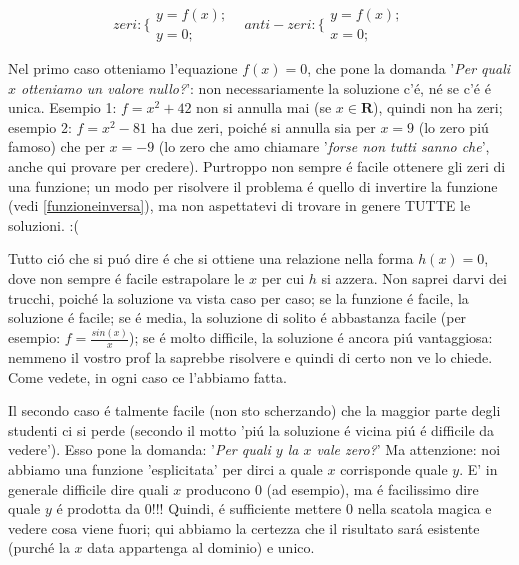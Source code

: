 \begin{equation}
zeri: \bigg\{
	\begin{array}{l}
	  y=f(x); \\
 	  y=0; 
	\end{array}
\hspace{10pt} anti-zeri: \bigg\{
	\begin{array}{l}
	  y=f(x); \\
 	  x=0; 
	\end{array}
\end{equation}

Nel primo caso otteniamo l'equazione $f(x)=0$, che pone la domanda '{\em Per quali $x$ otteniamo un valore nullo?}':
non necessariamente la soluzione c'\'e, n\'e se c'\'e \'e unica. Esempio 1: $f=x^2+42$ non si annulla mai
(se $x \in \mathbf{R}$), quindi non ha zeri; esempio 2: $f=x^2-81$ ha due zeri, poich\'e si annulla sia per $x=9$
(lo zero pi\'u famoso) che per $x=-9$ (lo zero che amo chiamare '{\em forse non tutti sanno che}', anche qui provare
per credere). Purtroppo non sempre \'e facile ottenere gli zeri di una funzione; un modo per risolvere il problema
\'e quello di invertire la funzione (vedi \ref{funzioneinversa}), ma non aspettatevi di trovare in genere TUTTE le soluzioni. :(

Tutto ci\'o che si pu\'o dire \'e che si ottiene una relazione nella forma $h(x)=0$, dove non sempre \'e facile
estrapolare le $x$ per cui $h$ si azzera. Non saprei darvi dei trucchi, poich\'e la soluzione va vista caso per caso;
se la funzione \'e facile, la soluzione \'e facile; se \'e media, la soluzione di solito \'e abbastanza facile (per
esempio: $f=\frac{sin(x)}{x}$); se \'e molto difficile, la soluzione \'e ancora pi\'u vantaggiosa: nemmeno il vostro
prof la saprebbe risolvere e quindi di certo non ve lo chiede. Come vedete, in ogni caso ce l'abbiamo fatta.


Il secondo caso \'e talmente facile (non sto scherzando) che la maggior parte degli studenti ci si perde (secondo
il motto 'pi\'u la soluzione \'e vicina pi\'u \'e difficile da vedere'). Esso pone la domanda: '{\em Per quali
$y$ la $x$ vale zero?}' Ma attenzione: noi abbiamo una funzione 'esplicitata' per dirci a quale $x$ corrisponde
quale $y$. E' in generale difficile dire quali $x$ producono $0$ (ad esempio), ma \'e facilissimo dire quale
$y$ \'e prodotta da $0$!!! Quindi, \'e sufficiente mettere $0$ nella scatola magica e vedere cosa viene fuori;
qui abbiamo la certezza che il risultato sar\'a esistente (purch\'e la $x$ data appartenga al dominio) e unico.

